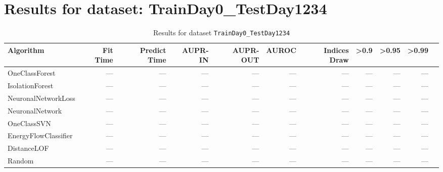\documentclass{article}
\begin{document}
\section*{Results for dataset: TrainDay0_TestDay1234}
\begin{table}[h!]
\centering
\caption{Results for dataset \texttt{TrainDay0_TestDay1234}}
\label{tab:trainday0testday1234}
\begin{tabular}{lrrrrrrrrrr}
\toprule
Algorithm & Fit Time & Predict Time & AUPR-IN & AUPR-OUT & AUROC & Indices Draw & >0.9 & >0.95 & >0.99 \\
\midrule
OneClassForest & --- & --- & --- & --- & --- & --- & --- & --- & --- \\
IsolationForest & --- & --- & --- & --- & --- & --- & --- & --- & --- \\
NeuronalNetworkLoss & --- & --- & --- & --- & --- & --- & --- & --- & --- \\
NeuronalNetwork & --- & --- & --- & --- & --- & --- & --- & --- & --- \\
OneClassSVN & --- & --- & --- & --- & --- & --- & --- & --- & --- \\
EnergyFlowClassifier & --- & --- & --- & --- & --- & --- & --- & --- & --- \\
DistanceLOF & --- & --- & --- & --- & --- & --- & --- & --- & --- \\
Random & --- & --- & --- & --- & --- & --- & --- & --- & --- \\
\bottomrule
\end{tabular}
\end{table}
\end{document}
